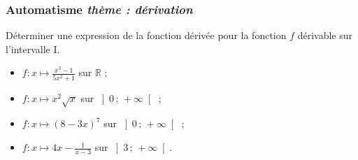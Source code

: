 \documentclass[11pt]{beamer}
\newcommand{\R}{\mathbb{R}}
\newcommand{\Interoo}[2]{\left]#1\, ;\, #2\right[}
\newcounter{autocompteur}
\newcommand{\automatisme}[1]{\addtocounter{autocompteur}{1}\frametitle{Automatisme  \theautocompteur  \textit{ thème : #1}}}
\begin{document}
\begin{frame}
\automatisme{dérivation}

Déterminer une expression de la fonction dérivée pour la fonction $f$ dérivable sur l'intervalle I.
\begin{itemize}
\item $f:x \mapsto \frac{x^3-1}{5x^{2}+1}$ sur $\R$ ;
 \item $f:x \mapsto x^2\sqrt{x}$ sur $\Interoo{0}{+\infty}$ ;
 \item $f:x \mapsto \left(8-3x\right)^{7}$ sur $\Interoo{0}{+\infty}$ ; 
 \item $f:x \mapsto 4x-\frac{1}{x-3}$ sur $\Interoo{3}{+\infty}$.
\end{itemize}

\end{frame}
\end{document}
